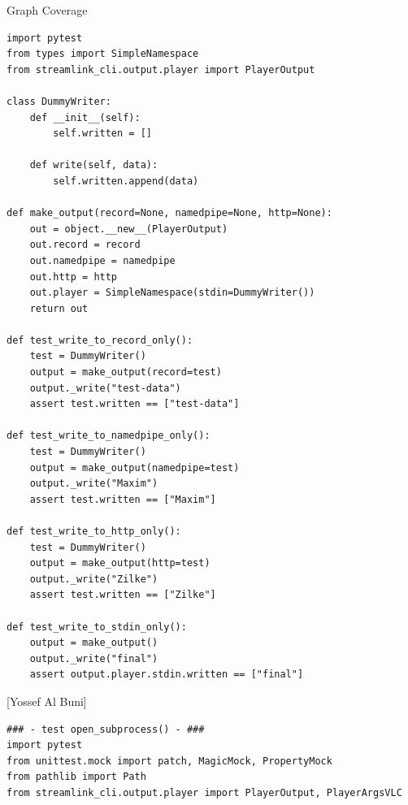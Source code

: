 \documentclass[a4paper]{scrreprt}
\newcounter{question}
\begin{document}
\begin{question}{Graph Coverage}
\begin{enumerate}[topsep=0pt, leftmargin=*]
\begin{answer}
    \begin{lstlisting}[caption={Maxim Zilke: branch coverage tests}, label={}]
import pytest
from types import SimpleNamespace
from streamlink_cli.output.player import PlayerOutput

class DummyWriter:
    def __init__(self):
        self.written = []

    def write(self, data):
        self.written.append(data)

def make_output(record=None, namedpipe=None, http=None):
    out = object.__new__(PlayerOutput)
    out.record = record
    out.namedpipe = namedpipe
    out.http = http
    out.player = SimpleNamespace(stdin=DummyWriter())
    return out

def test_write_to_record_only():
    test = DummyWriter()
    output = make_output(record=test)
    output._write("test-data")
    assert test.written == ["test-data"]

def test_write_to_namedpipe_only():
    test = DummyWriter()
    output = make_output(namedpipe=test)
    output._write("Maxim")
    assert test.written == ["Maxim"]

def test_write_to_http_only():
    test = DummyWriter()
    output = make_output(http=test)
    output._write("Zilke")
    assert test.written == ["Zilke"]

def test_write_to_stdin_only():
    output = make_output()
    output._write("final")
    assert output.player.stdin.written == ["final"]

             \end{lstlisting}
            


            [Yossef Al Buni]

             \begin{lstlisting}[style=pythongrey]
             ### - test open_subprocess() - ###
import pytest
from unittest.mock import patch, MagicMock, PropertyMock
from pathlib import Path
from streamlink_cli.output.player import PlayerOutput, PlayerArgsVLC


\end{lstlisting}
\end{answer}
\end{enumerate}
\end{question}
\end{document}
